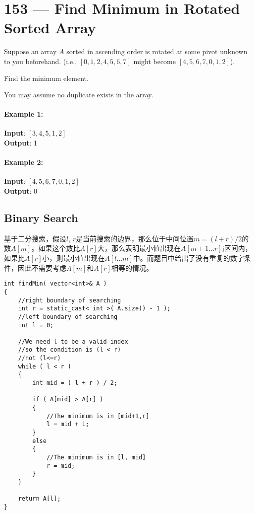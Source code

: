 \section{153 --- Find Minimum in Rotated Sorted Array}
Suppose an array $A$ sorted in ascending order is rotated at some pivot unknown to you beforehand. (i.e., $[0,1,2,4,5,6,7]$ might become  $[4,5,6,7,0,1,2]$).
\par
Find the minimum element.
\par
You may assume no duplicate exists in the array.
\paragraph{Example 1:}
\begin{flushleft}
\textbf{Input}: $[3,4,5,1,2]$
\\
\textbf{Output}: 1
\end{flushleft}
\paragraph{Example 2:}
\begin{flushleft}
\textbf{Input}: $[4,5,6,7,0,1,2]$
\\
\textbf{Output}: 0
\end{flushleft}
\subsection{Binary Search}
\begin{CJK*}{UTF8}{gbsn}
基于二分搜索，假设$l$, $r$是当前搜索的边界，那么位于中间位置$m=(l+r)/2$的数$A[m]$。如果这个数比$A[r]$大，那么表明最小值出现在$A[m+1\ldots r]$j区间内，如果比$A[r]$小，则最小值出现在$A[l\ldots m]$中。而题目中给出了没有重复的数字条件，因此不需要考虑$A[m]$和$A[r]$相等的情况。
\end{CJK*}
\setcounter{lstlisting}{0}
\begin{lstlisting}[style=customc, caption={Binary Search}]
int findMin( vector<int>& A )
{
	//right boundary of searching
	int r = static_cast< int >( A.size() - 1 ); 
	//left boundary of searching
	int l = 0;

	//We need l to be a valid index 
	//so the condition is (l < r)
	//not (l<=r)
	while ( l < r )
	{
		int mid = ( l + r ) / 2;

		if ( A[mid] > A[r] )
		{
			//The minimum is in [mid+1,r]
			l = mid + 1;
		}
		else
		{
			//The minimum is in [l, mid]
			r = mid;
		}
	}

	return A[l];
}
\end{lstlisting}
